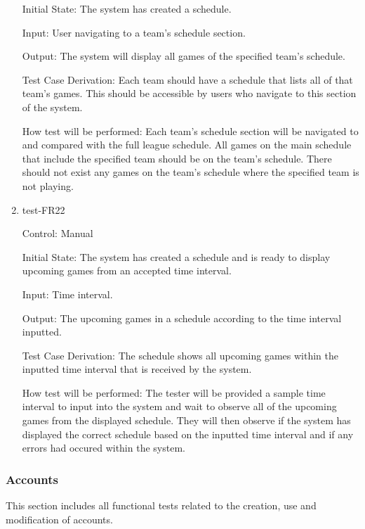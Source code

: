 \documentclass[12pt, titlepage]{article}
\begin{document}
\begin{enumerate}
  Initial State: The system has created a schedule.
            
  Input: User navigating to a team's schedule section.
            
  Output: The system will display all games of the specified team's schedule.

  Test Case Derivation: Each team should have a schedule that lists all of
  that team's games. This should be accessible by users who navigate to this
  section of the system.
            
  How test will be performed: Each team's schedule section will be navigated to
  and compared with the full league schedule. All games on the main schedule
  that include the specified team should be on the team's schedule. There should
  not exist any games on the team's schedule where the specified team is not
  playing.

  \item{test-FR22\\}

  Control: Manual
            
  Initial State: The system has created a schedule and is ready to display upcoming games from
  an accepted time interval.
            
  Input: Time interval.
            
  Output: The upcoming games in a schedule according to the time interval inputted.

  Test Case Derivation: The schedule shows all upcoming games within the inputted time interval
  that is received by the system.
            
  How test will be performed: The tester will be provided a sample time interval to input
  into the system and wait to observe all of the upcoming games from the displayed schedule.
  They will then observe if the system has displayed the correct schedule based on the
  inputted time interval and if any errors had occured within the system. 

\end{enumerate}

\subsubsection{Accounts}

This section includes all functional tests related to the creation, use and
modification of accounts.
\end{document}
